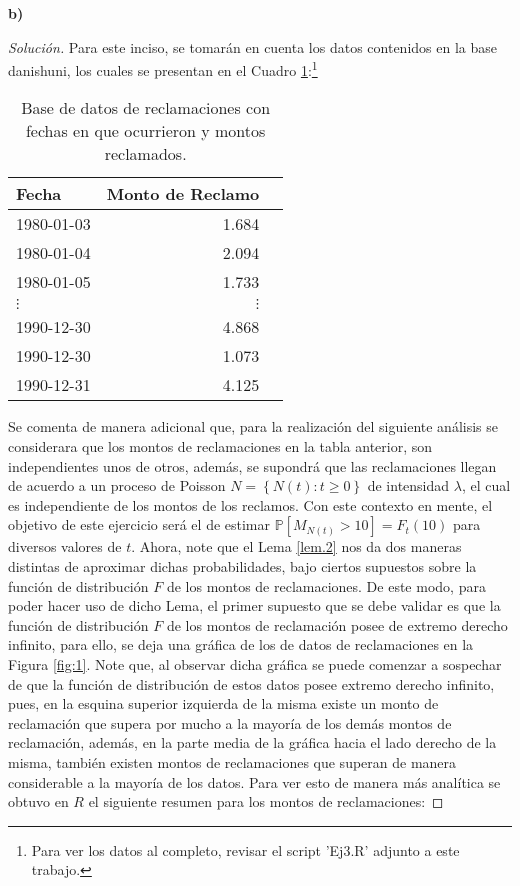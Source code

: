 \documentclass[10.5pt,notitlepage]{article}
\newenvironment{solucion}
  {\begin{proof}[Solución]}
  {\end{proof}}
\newcommand{\PP}{\mathbb{P}}
\newcommand{\kis}[1]{\left\{ #1 \right\}}
\theoremstyle{plain}
\begin{document}
\newpage
\textbf{b)}
\begin{solucion}
Para este inciso, se tomarán en cuenta los datos contenidos en la base danishuni, los cuales se presentan en el Cuadro \ref{tab:1}:\footnote{Para ver los datos al completo, revisar el script 'Ej3.R' adjunto a este trabajo.}
\begin{table}[H]
        \centering
        \begin{tabular}{@{}l@{\hskip 0.3in}r@{\hskip 0.3in}r@{}}
        \toprule
        Fecha &  Monto de Reclamo\\
        \midrule          
     1980-01-03& 1.684\\
 1980-01-04 &2.094\\
 1980-01-05& 1.733\\
        \(\vdots\)& \(\vdots\)\\
1990-12-30& 4.868\\
 1990-12-30& 1.073\\
1990-12-31& 4.125\\   
        \end{tabular}
        \caption{Base de datos de reclamaciones con fechas en que ocurrieron y montos reclamados.}
        \label{tab:1}
\end{table}
Se comenta de manera adicional que, para la realización del siguiente análisis se considerara que los montos de  reclamaciones en la tabla anterior, son independientes unos de otros, además, se supondrá que las reclamaciones llegan de acuerdo a un proceso de Poisson \(N = \kis{N(t): t \geq 0}\)  de intensidad \(\lambda\), el cual es independiente de los montos de los reclamos. Con este contexto en mente, el objetivo de este ejercicio será el de estimar \(\PP[M_{N(t)} > 10
] = F_t(10)\) para diversos valores de \(t\). Ahora, note que el Lema \ref{lem.2} nos da dos maneras distintas de aproximar dichas probabilidades, bajo ciertos supuestos sobre la función de distribución \(F\) de los montos de reclamaciones. De este modo, para poder hacer uso de dicho Lema, el primer supuesto que se debe validar es que la función de distribución \(F\) de los montos de reclamación posee de extremo derecho infinito, para ello, se deja una gráfica de los de datos de reclamaciones en la Figura \ref{fig:1}. Note que, al observar dicha gráfica se puede comenzar a sospechar de que la función de distribución de estos datos posee extremo derecho infinito, pues, en la esquina superior izquierda de la misma existe un monto de reclamación que supera por mucho a la mayoría de los demás montos de reclamación, además, en la parte media de la gráfica hacia el lado derecho de la misma, también existen montos de reclamaciones que superan de manera considerable a la mayoría de los datos. Para ver esto de manera más analítica se obtuvo en \(R\) el siguiente resumen para los montos de reclamaciones:

\end{solucion}
\end{document}
